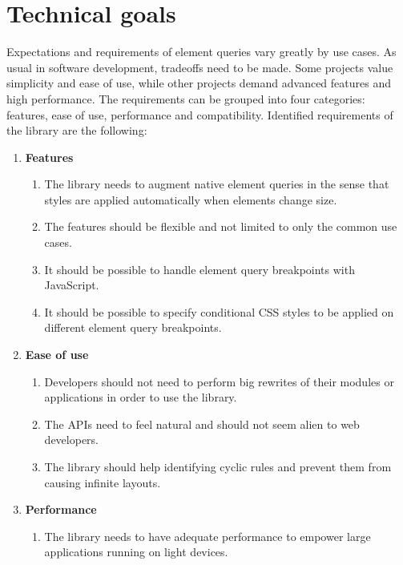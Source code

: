 \documentclass[a4paper,11pt]{kth-mag}
\begin{document}
    \section{Technical goals}\label{sec:techincal-goals}
      Expectations and requirements of element queries vary greatly by use cases.
      As usual in software development, tradeoffs need to be made.
      Some projects value simplicity and ease of use, while other projects demand advanced features and high performance.
      The requirements can be grouped into four categories: features, ease of use, performance and compatibility.
      Identified requirements of the library are the following:
      \begin{enumerate}
        \item \textbf{Features}
          \begin{enumerate}
            \item\label{itm:req_resize_detect} The library needs to augment \gls{native} element queries in the sense that styles are applied automatically when \glspl{element} change size.
            \item The features should be flexible and not limited to only the common use cases.
            \item It should be possible to handle element query breakpoints with JavaScript.
            \item It should be possible to specify conditional \gls{CSS} styles to be applied on different element query breakpoints.
          \end{enumerate}
        \item \textbf{Ease of use}
          \begin{enumerate}
            \item\label{itm:req_big_rewrite} Developers should not need to perform big rewrites of their modules or applications in order to use the library.
            \item\label{itm:natural} The \glspl{API} need to feel natural and should not seem alien to \gls{web} developers.
            \item The library should help identifying cyclic rules and prevent them from causing infinite layouts.
          \end{enumerate}
        \item \textbf{Performance}
          \begin{enumerate}
            \item The library needs to have adequate performance to empower large applications running on light devices.

\end{enumerate}
\end{enumerate}
\end{document}
